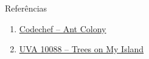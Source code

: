 \begin{frame}[fragile]{Referências}

    \begin{enumerate}
        \item \href{https://www.codechef.com/problems/KGP13F}{Codechef -- Ant Colony}

        \item \href{https://uva.onlinejudge.org/index.php?option=com_onlinejudge&Itemid=8&category=24&page=show_problem&problem=1029}{UVA 10088 -- Trees on My Island}

    \end{enumerate}

\end{frame}
